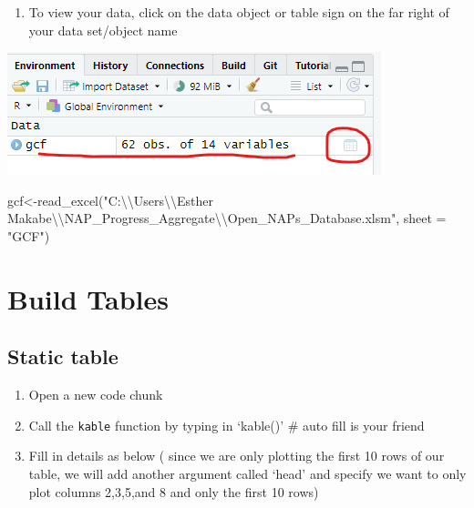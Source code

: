\documentclass[
]{book}
\newenvironment{Shaded}{\begin{snugshade}}{\end{snugshade}}
\newcommand{\AttributeTok}[1]{\textcolor[rgb]{0.77,0.63,0.00}{#1}}
\newcommand{\FunctionTok}[1]{\textcolor[rgb]{0.00,0.00,0.00}{#1}}
\newcommand{\NormalTok}[1]{#1}
\newcommand{\OtherTok}[1]{\textcolor[rgb]{0.56,0.35,0.01}{#1}}
\newcommand{\SpecialCharTok}[1]{\textcolor[rgb]{0.00,0.00,0.00}{#1}}
\newcommand{\StringTok}[1]{\textcolor[rgb]{0.31,0.60,0.02}{#1}}
\providecommand{\tightlist}{%
  \setlength{\itemsep}{0pt}\setlength{\parskip}{0pt}}
\let\origfigure\figure
\let\endorigfigure\endfigure
\renewenvironment{figure}[1][2] {
    \expandafter\origfigure\expandafter[H]
} {
    \endorigfigure
}
\begin{document}
\begin{enumerate}
\def\labelenumi{\arabic{enumi}.}
\setcounter{enumi}{8}
\tightlist
\item
  To view your data, click on the data object or table sign on the far right of your data set/object name
\end{enumerate}

\begin{figure}
\centering
\includegraphics{tutorial_screenshots/view_exel.png}
\caption{view excel data}
\end{figure}

\begin{Shaded}
\begin{Highlighting}[]
\NormalTok{gcf}\OtherTok{\textless{}{-}}\FunctionTok{read\_excel}\NormalTok{(}\StringTok{"C:}\SpecialCharTok{\textbackslash{}\textbackslash{}}\StringTok{Users}\SpecialCharTok{\textbackslash{}\textbackslash{}}\StringTok{Esther Makabe}\SpecialCharTok{\textbackslash{}\textbackslash{}}\StringTok{NAP\_Progress\_Aggregate}\SpecialCharTok{\textbackslash{}\textbackslash{}}\StringTok{Open\_NAPs\_Database.xlsm"}\NormalTok{, }\AttributeTok{sheet =} \StringTok{"GCF"}\NormalTok{)}
\end{Highlighting}
\end{Shaded}

\hypertarget{build-tables}{%
\section{Build Tables}\label{build-tables}}

\hypertarget{static-table}{%
\subsection{Static table}\label{static-table}}

\begin{enumerate}
\def\labelenumi{\arabic{enumi}.}
\tightlist
\item
  Open a new code chunk
\item
  Call the \texttt{kable} function by typing in `kable()' \# auto fill is your friend
\item
  Fill in details as below ( since we are only plotting the first 10 rows of our table, we will add another argument called `head' and specify we want to only plot columns 2,3,5,and 8 and only the first 10 rows)
\end{enumerate}
\end{document}
